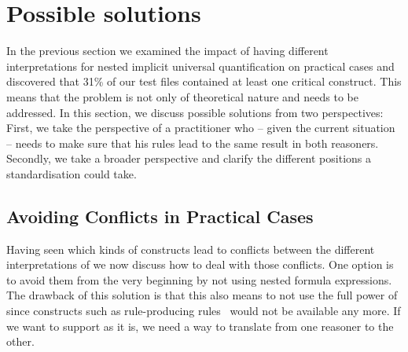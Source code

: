\section{Possible solutions}\label{solution}
In the previous section we examined the impact of having different interpretations for nested implicit universal quantification on practical cases and discovered that 31\% of our test files
contained at least one critical construct. This means that the problem is not only of theoretical nature and needs to be addressed. In this section, we discuss possible solutions from two perspectives:
First, we
take the perspective of a
practitioner who -- given the current situation -- needs to make sure that his rules lead to the same result in both reasoners.
Secondly, we take a  broader perspective and clarify
the different positions a standardisation could take.


\subsection{Avoiding Conflicts in Practical Cases}
Having seen which kinds of constructs lead to conflicts between the different interpretations of \nthree %
we now discuss how to deal with those conflicts. One option is to avoid them from the very beginning by not using nested formula expressions. 
The drawback of this solution is that
this also means to not use the full power of \nthree since constructs such as rule-producing rules~\cite{ORCA2} would not be available any more. 
If we want to support \nthree as it is, we need a way to translate from one reasoner to the other.

